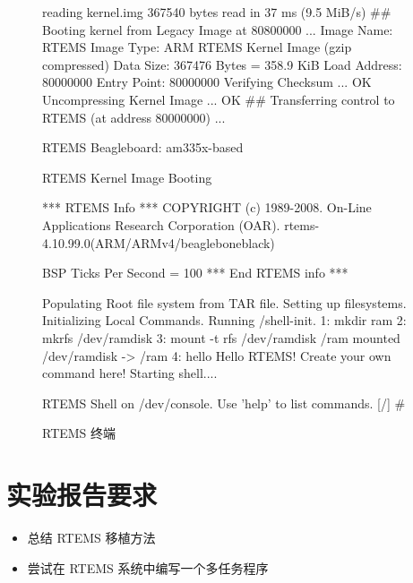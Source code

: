 \begin{figure}
\begin{blockcode}
reading kernel.img                                                              
367540 bytes read in 37 ms (9.5 MiB/s)                                          
## Booting kernel from Legacy Image at 80800000 ...                             
   Image Name:   RTEMS                                                          
   Image Type:   ARM RTEMS Kernel Image (gzip compressed)                       
   Data Size:    367476 Bytes = 358.9 KiB                                       
   Load Address: 80000000                                                       
   Entry Point:  80000000                                                       
   Verifying Checksum ... OK                                                    
   Uncompressing Kernel Image ... OK                                            
## Transferring control to RTEMS (at address 80000000) ...                      

RTEMS Beagleboard: am335x-based                                                 

RTEMS Kernel Image Booting                                                      

*** RTEMS Info ***                                                              
COPYRIGHT (c) 1989-2008.                                                        
On-Line Applications Research Corporation (OAR).                                
rtems-4.10.99.0(ARM/ARMv4/beagleboneblack)                                      

BSP Ticks Per Second = 100                                                     
*** End RTEMS info ***                                                          

Populating Root file system from TAR file.                                      
Setting up filesystems.                                                         
Initializing Local Commands.                                                    
Running /shell-init.                                                            
1: mkdir ram                                                                    
2: mkrfs /dev/ramdisk                                                           
3: mount -t rfs /dev/ramdisk /ram                                               
mounted /dev/ramdisk -> /ram                                                    
4: hello                                                                        
Hello RTEMS!                                                                    
Create your own command here!                                                   
Starting shell....                                                              

RTEMS Shell on /dev/console. Use 'help' to list commands.                       
[/] # 
\end{blockcode}
\caption{RTEMS 终端}
\end{figure}


\section{实验报告要求}
\begin{itemize}
    \item 总结 RTEMS 移植方法
    \item 尝试在 RTEMS 系统中编写一个多任务程序
\end{itemize}
